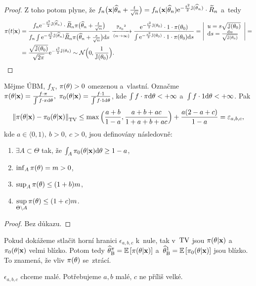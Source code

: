 \begin{dusl}
\begin{proof}
		Z toho potom plyne, že $f_n\big(\textbf{x}|\widehat{\theta}_n+\frac{t}{\sqrt{n}}\big)=f_n(\textbf{x}|\widehat{\theta}_n)\mathrm{e}^{-\frac{t^2}{2}\mathbb{J}(\widehat{\theta}_n)}\cdot\widetilde{R}_n$ a~tedy \[
		\begin{split}
		\pi(t|\textbf{x})&=\frac{f_n\e{-\frac{t^2}{2}\mathbb{J}(\htn)}\cdot\widetilde{R}_n \pi\big( \htn+\frac{t}{\sqrt{n}} \big)}{f_n\int \e{-\frac{s^2}{2}\mathbb{J}(\htn)}\widetilde{R}_n \pi\big(\htn+\frac{s}{\sqrt{n}}\big)\d s}\xrightarrow[(n\rightarrow \infty)]{\PP_{\t_0}\text{\footnotemark}}\frac{\e{-\frac{t^2}{2}\mathbb{J}(\t_0)}\cdot1\cdot \pi(\t_0)}{\int\e{-\frac{s^2}{2}\mathbb{J}(\t_0)}\cdot1\cdot\pi(\t_0)\d s}=\left| \begin{array}{l}
		u=s\sqrt{\mathbb{J}(\t_0)}\\\d s=\frac{\d u}{\sqrt{\mathbb{J}(\t_0)}}		
		\end{array}
		\right|=\\&=\frac{\sqrt{\mathbb{J}(\t_0)}}{\sqrt{2\pi}}\e{-\frac{t^2}{2}\mathbb{J}(\t_0)}\sim\NN\Big( 0,\frac{1}{\mathbb{J}(\t_0)} \Big).
		\end{split}
		\]
	\end{proof}
\end{dusl}
\begin{theorem}
	Mějme ÚBM, $f_X$, $\pi(\theta)>0$ omezenou a~vlastní. Označme $\pi(\theta|\textbf{x})=\frac{f\cdot\pi}{\int f\cdot\pi\mathrm{d}\theta},~\pi_0(\theta|\textbf{x})=\frac{f\cdot1}{\int f\cdot1 \mathrm{d}\theta}$, kde $\int f\cdot\pi\mathrm{d}\theta<+\infty$ a~$\int f\cdot1 \mathrm{d}\theta<+\infty$. Pak
	$$ \left\|\pi(\theta|\textbf{x})-\pi_0(\theta|\textbf{x})\right\|_{\mathrm{TV}}\leq \max\Big(\frac{a+b}{1-a},\frac{a+b+ac}{1+a+b+ac}\Big)+\frac{a(2-a+c)}{1-a}=\varepsilon_{a,b,c},$$
	kde $a\in\langle 0,1),~b>0,~c>0$, jsou definovány následovně:\begin{enumerate}[1)]
		\item $\exists A\subset \Theta$ tak, že $\int_A \pi_0(\theta|\textbf{x})\mathrm{d}\theta\geq 1-a$,
		\item $\inf_A \pi(\theta)=m>0$,
		\item $\sup_A \pi(\theta)\leq (1+b)m$,
		\item $\sup\limits_{\Theta\setminus A} \pi(\theta)\leq(1+c)m$. 
	\end{enumerate}
\end{theorem}
\begin{proof}
	Bez důkazu.
\end{proof}
\begin{dusl}
	Pokud dokážeme stlačit horní hranici $\epsilon_{a,b,c}$ k~nule, tak v~$\mathrm{TV}$ jsou $\pi(\theta|\textbf{x})$ a~$\pi_0(\theta|\textbf{x})$ velmi blízko. Potom tedy $\widehat{\theta}_\mathrm{B}^\pi=\mathbb{E}\left[ \pi(\theta|\textbf{x}) \right]$ a~$\widehat{\theta}_\mathrm{B}^1=\mathbb{E}\left[ \pi_0(\theta|\textbf{x}) \right]$ jsou blízko. To znamená, že vliv $\pi(\theta)$ se~ztrácí.
\end{dusl}
\begin{remark}
	$\epsilon_{a,b,c}$ chceme malé. Potřebujeme $a,b$ malé, $c$ ne příliš velké.
\end{remark}


